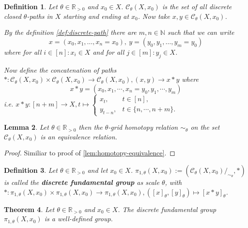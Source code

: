 \documentclass[a4paper, 11pt, twoside]{article}
\newcommand{\R}[0]{\mathbb{R}}
\newcommand{\N}[0]{\mathbb{N}}
\theoremstyle{break}
\newtheorem{thm}{Theorem}[section]
\theoremstyle{break}
\newtheorem{defin}[thm]{Definition}
\newtheorem{lemma}[thm]{Lemma}
\begin{document}
\begin{defin}
  Let $\theta \in \R_{>0}$ and $x_0 \in X$. $\mathcal{C}_{\theta}(X, x_0)$ is the set of all discrete closed $\theta$-paths in $X$ starting and ending at $x_0$. Now take $x, y \in \mathcal{C}_{\theta}(X, x_0)$.
  
  By the definition \ref{def:discrete-path} there are $m,n \in \N$ such that we can write
  \begin{equation*}
    x = (x_0, x_1, \ldots, x_n = x_0), \: y = (y_0, y_1, \ldots, y_m = y_0)
  \end{equation*} where for all $i \in [n]\colon x_i \in X$ and for all $j \in [m]: y_j \in X$.

  Now define the concatenation of paths $*\colon \mathcal{C}_{\theta}(X, x_0) \times \mathcal{C}_{\theta}(X, x_0) \to \mathcal{C}_{\theta}(X, x_0), (x, y) \to x * y$ where
  \begin{equation*}
    x * y = (x_0, x_1, \cdots, x_n = y_0, y_1, \cdots, y_m)
  \end{equation*}
  i.e. $x * y\colon [n+m] \to X, t \mapsto \begin{cases}
    x_t, &t \in [n], \\
    y_{t-n}, &t \in \{n, \cdots, n+m\}.
  \end{cases}$

  \cite[p. 3]{barcelo2014discrete}
\end{defin}

\begin{lemma} \label{lem:discrete-homotopy}
  Let $\theta \in \R_{>0}$ then the $\theta$-grid homotopy relation $\sim_{\theta}$ on the set $\mathcal{C}_{\theta}(X, x_0)$ is an equivalence relation.
\end{lemma}

\begin{proof}
  Similiar to proof of \ref{lem:homotopy-equivalence}.
\end{proof}

\begin{defin}
  Let $\theta \in \R_{>0}$ and let $x_0 \in X$. $\pi_{1,\theta}(X, x_0) := (\mathcal{C}_{\theta}(X, x_0)/_{\sim_{\theta}}, *)$ is called the \textbf{discrete fundamental group} as scale $\theta$,
  with $*\colon \pi_{1,\theta}(X, x_0) \times \pi_{1,\theta}(X, x_0) \to \pi_{1,\theta}(X, x_0), ([x]_{\theta}, [y]_{\theta}) \mapsto [x * y]_{\theta}$.
\end{defin}

\begin{thm}
  Let $\theta \in \R_{>0}$ and $x_0 \in X$. The discrete fundamental group $\pi_{1,\theta}(X, x_0)$ is a well-defined group.
\end{thm}
\end{document}
